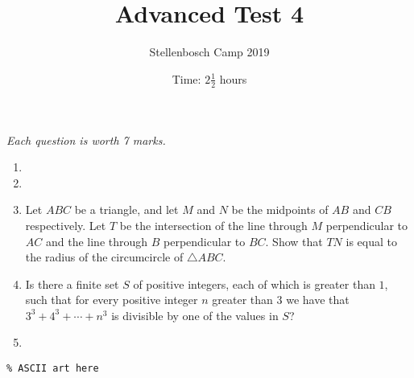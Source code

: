 \documentclass{article}
\title{Advanced Test 4}
\author{Stellenbosch Camp 2019}
\date{Time: $2\frac{1}{2}$ hours}
\begin{document}
\maketitle
\thispagestyle{empty}

\hfill\textit{Each question is worth 7 marks.}

\vfill
\vfill


\begin{enumerate}[1.]

\item %


\vfill

\item %


\vfill

\item %
Let $ABC$ be a triangle, and let $M$ and $N$ be the midpoints of $AB$ and $CB$ respectively.
Let $T$ be the intersection of the line through $M$ perpendicular to $AC$ and the line through $B$ perpendicular to $BC$.
Show that $TN$ is equal to the radius of the circumcircle of $\triangle ABC$.


\vfill

\item %
Is there a finite set $S$ of positive integers, each of which is greater than $1$, such that for every positive integer $n$ greater than $3$ we have that $3^3 +4^3 +\dotsb +n^3$ is divisible by one of the values in $S$?


\vfill

\item %


\end{enumerate}


\vfill
\vfill
\begin{center}
\begin{BVerbatim}
\end{BVerbatim}
\end{center}
\end{document}
